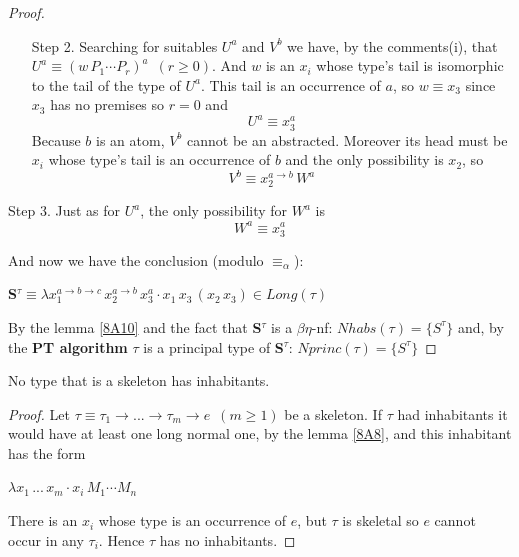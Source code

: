 \documentclass[a4paper,10pt]{article}
\begin{document}
\begin{exa}[A type $\tau$ with $\#(\tau) =1$]
\begin{proof}
\begin{itemize}
 \item[Step 2.] Searching for suitables $U^a$ and $V^b$ we have, by the comments(i), that $U^a \equiv (w\,P_1 \cdots P_r)^a \,\,\, (r \geq 0)$.
  And $w$ is an $x_i$ whose type's tail is isomorphic to the tail of the type of $U^a$.
  This tail is an occurrence of $a$, so $w \equiv x_3$ since $x_3$ has no premises so $r = 0$ and
\begin{equation}
 U^a \equiv x_3^a
\end{equation}
Because $b$ is an atom, $V^b$ cannot be an abstracted. Moreover its head must be $x_i$ whose type's tail is an occurrence of $b$ and
the only possibility is $x_2$, so 
\begin{equation}
  V^b \equiv x_2^{a \to b} \, W^a
\end{equation}
  \end{itemize}
 \item[Step 3.] Just as for $U^a$, the only possibility for $W^a$ is
\begin{equation}
  W^a \equiv x_3^a
\end{equation}

\noindent And now we have the conclusion (modulo $\equiv_{\alpha}$):

\begin{center}
   \textbf{S}$^{\tau} \equiv \lambda x_1^{a \to b \to c}\,x_2^{a \to b}\,x_3^a\cdot x_1\,x_3\,(x_2\,x_3) \in Long(\tau)$
\end{center}

\noindent By the lemma \ref{8A10} and the fact that \textbf{S}$^{\tau}$ is a $\beta\eta$-nf: $Nhabs(\tau) = \{S^{\tau}\}$ and, by the \textbf{PT algorithm} 
$\tau$ is a principal type of \textbf{S}$^{\tau}$: $Nprinc(\tau) = \{S^{\tau}\}$ 
\end{proof}
\end{exa}

\vspace*{0.5 cm}

\begin{exa}[A type $\tau$ with $\#(\tau) =0$] \label{8B5}
     No type that is a skeleton has inhabitants.
\begin{proof}
 Let $\tau \equiv \tau_1 \to ... \to \tau_m \to e\,\,\,(m \geq 1)$ be a skeleton. If $\tau$ had inhabitants it would have at least one long normal one, by the lemma \ref{8A8},
 and this inhabitant has the form
 \begin{center}
    $\lambda x_1\,...\,x_m\cdot x_i\,M_1\cdots M_n$
 \end{center}
There is an $x_i$ whose type is an occurrence of $e$, but $\tau$ is skeletal so $e$ cannot occur in any $\tau_i$. Hence $\tau$ has no inhabitants.
\end{proof}
\end{exa}
\end{document}
